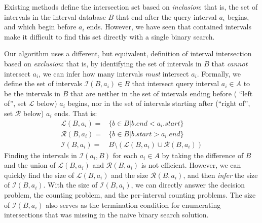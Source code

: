 \documentclass{bioinfo}
\begin{document}
Existing methods define the intersection set based on \emph{inclusion}: that is,
the set of intervals in the interval database $B$ that end after the query
interval $a_i$ begins, and which begin before $a_i$ ends.  However, we have seen 
that contained intervals make it difficult to find this set directly with a 
single binary search.  

Our algorithm uses a different, but equivalent, definition of interval
intersection based on \emph{exclusion}: that is, by identifying the set of
intervals in $B$ that \emph{cannot} intersect $a_i$, we can infer how many
intervals \emph{must} intersect $a_i$. Formally, we define the set of intervals
$\mathcal{I}(B,a_i) \in B$ that intersect query interval $a_i\in A$ to be the
intervals in $B$ that are neither in the set of intervals ending before (
``left of'', set $\mathcal{L}$ below) $a_i$ begins, nor in the set of intervals
starting after (``right of'', set $\mathcal{R}$ below) $a_i$ ends.  That is:
\vspace{-.75em}
\begin{equation*}
  \begin{split}
      \mathcal{L}(B,a_i) = &\{b\in B| b.end < a_i.start\} \\
      \mathcal{R}(B,a_i) = &\{b\in B| b.start > a_i.end\} \\
      \mathcal{I}(B,a_i) = &B \setminus (\mathcal{L}(B,a_i) \cup \mathcal{R}(B,a_i))
  \end{split}
\end{equation*}
Finding the intervals in $\mathcal{I}(a_i,B)$ for each $a_i\in A$ by taking the
difference of $B$ and the union of $\mathcal{L}(B,a_i)$ and $\mathcal{R}(B,a_i)$
is not efficient.  However, we can quickly find the size of $\mathcal{L}(B,a_i)$
and the size $\mathcal{R}(B,a_i)$, and then \emph{infer} the size of
$\mathcal{I}(B,a_i)$.  With the size of $\mathcal{I}(B,a_i)$, we can directly
answer the decision problem, the counting problem, and the per-interval counting
problems.  The size of $\mathcal{I}(B,a_i)$ also serves as the termination condition for enumerating intersections that was missing in the naive binary search solution.
\end{document}
